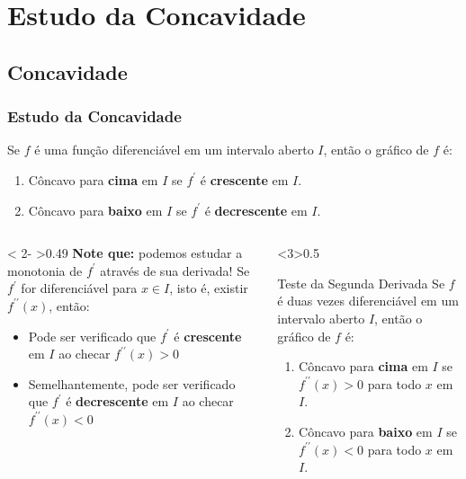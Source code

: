 \section{Estudo da Concavidade}

\subsection{Concavidade}
\begin{frame}
  \frametitle{Estudo da Concavidade}
  \begin{theorem}
    Se $f$ é uma função diferenciável em um intervalo aberto $I$, então o gráfico de $f$ é:
    \begin{enumerate}
      \item Côncavo para \textbf{cima} em $I$ se $f^{\prime}$ é \textbf{crescente} em $I$.
      \item Côncavo para \textbf{baixo} em $I$ se $f^{\prime}$ é \textbf{decrescente} em $I$.
    \end{enumerate}
  \end{theorem}
  \begin{columns}[onlytextwidth]
    \begin{column}< 2- >{0.49\textwidth}
      \textbf{Note que:} podemos estudar a monotonia de $f^{\prime}$ através de sua derivada! Se $f^{\prime}$ for diferenciável para $x\in I$, isto é, existir $f^{\prime\prime}(x)$, então:
      \begin{itemize}
        \item Pode ser verificado que $f^{\prime}$ é \textbf{crescente} em $I$ ao checar $f^{\prime\prime}(x) > 0$
        \item Semelhantemente, pode ser verificado que $f^{\prime}$ é \textbf{decrescente} em $I$ ao checar $f^{\prime\prime}(x) < 0$
      \end{itemize}
    \end{column}
    \begin{column}<3>{0.5\textwidth}\vspace{-0.5cm}
      \begin{block}{Teste da Segunda Derivada}
        Se $f$ é duas vezes diferenciável em um intervalo aberto $I$, então o gráfico de $f$ é:
        \begin{enumerate}
          \item Côncavo para \textbf{cima} em $I$ se $f^{\prime\prime}(x) > 0$ para todo $x$ em $I$.
          \item Côncavo para \textbf{baixo} em $I$ se $f^{\prime\prime}(x) < 0$ para todo $x$ em $I$.
        \end{enumerate}
      \end{block}
    \end{column}
  \end{columns}
\end{frame}

